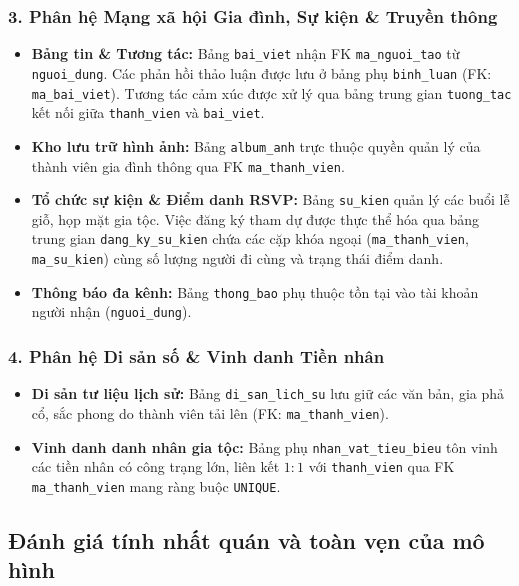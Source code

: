 \subsubsection{3. Phân hệ Mạng xã hội Gia đình, Sự kiện \& Truyền thông}
\begin{itemize}
    \item \textbf{Bảng tin \& Tương tác:} Bảng \texttt{bai\_viet} nhận FK \texttt{ma\_nguoi\_tao} từ \texttt{nguoi\_dung}. Các phản hồi thảo luận được lưu ở bảng phụ \texttt{binh\_luan} (FK: \texttt{ma\_bai\_viet}). Tương tác cảm xúc được xử lý qua bảng trung gian \texttt{tuong\_tac} kết nối giữa \texttt{thanh\_vien} và \texttt{bai\_viet}.
    \item \textbf{Kho lưu trữ hình ảnh:} Bảng \texttt{album\_anh} trực thuộc quyền quản lý của thành viên gia đình thông qua FK \texttt{ma\_thanh\_vien}.
    \item \textbf{Tổ chức sự kiện \& Điểm danh RSVP:} Bảng \texttt{su\_kien} quản lý các buổi lễ giỗ, họp mặt gia tộc. Việc đăng ký tham dự được thực thể hóa qua bảng trung gian \texttt{dang\_ky\_su\_kien} chứa các cặp khóa ngoại (\texttt{ma\_thanh\_vien}, \texttt{ma\_su\_kien}) cùng số lượng người đi cùng và trạng thái điểm danh.
    \item \textbf{Thông báo đa kênh:} Bảng \texttt{thong\_bao} phụ thuộc tồn tại vào tài khoản người nhận (\texttt{nguoi\_dung}).
\end{itemize}

\subsubsection{4. Phân hệ Di sản số \& Vinh danh Tiền nhân}
\begin{itemize}
    \item \textbf{Di sản tư liệu lịch sử:} Bảng \texttt{di\_san\_lich\_su} lưu giữ các văn bản, gia phả cổ, sắc phong do thành viên tải lên (FK: \texttt{ma\_thanh\_vien}).
    \item \textbf{Vinh danh danh nhân gia tộc:} Bảng phụ \texttt{nhan\_vat\_tieu\_bieu} tôn vinh các tiền nhân có công trạng lớn, liên kết $1:1$ với \texttt{thanh\_vien} qua FK \texttt{ma\_thanh\_vien} mang ràng buộc \texttt{UNIQUE}.
\end{itemize}

\subsection{Đánh giá tính nhất quán và toàn vẹn của mô hình}

